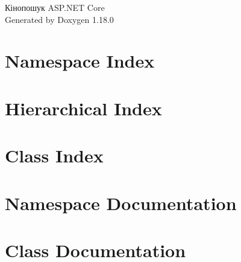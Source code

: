\documentclass[twoside]{book}
\newcommand{\+}{\discretionary{\mbox{\scriptsize$\hookleftarrow$}}{}{}}
\newcommand{\clearemptydoublepage}{%
    \newpage{\pagestyle{empty}\cleardoublepage}%
  }
\begin{document}
  \raggedbottom
    \hypersetup{pageanchor=false,
                bookmarksnumbered=true,
                pdfencoding=unicode
               }
  \begin{titlepage}
  \vspace*{7cm}
  \begin{center}%
  {\Large Кінопошук ASP.\+NET Core}\\
  \vspace*{1cm}
  {\large Generated by Doxygen 1.18.0}\\
  \end{center}
  \end{titlepage}
  \clearemptydoublepage
  \tableofcontents
  \clearemptydoublepage
  \hypersetup{pageanchor=true}

\chapter{Namespace Index}

\chapter{Hierarchical Index}

\chapter{Class Index}

\chapter{Namespace Documentation}





\chapter{Class Documentation}








  \backmatter
  \newpage
  \clearemptydoublepage
  \printindex
\end{document}
